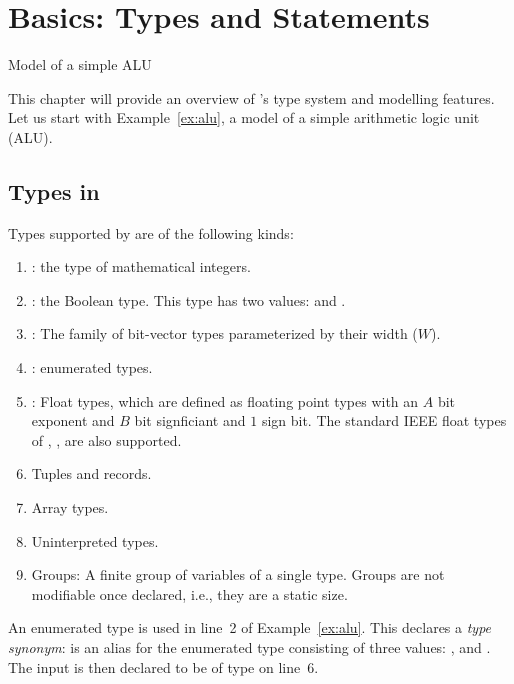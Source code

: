 \chapter{Basics: Types and Statements}
\begin{uclidlisting}[htbp]
    
    \caption{Model of a simple ALU}
\label{ex:alu}
\end{uclidlisting}

This chapter will provide an overview of \uclid{}'s type system and modelling features. Let us start with Example~\ref{ex:alu}, a model of a simple arithmetic logic unit (ALU).

\section{Types in \uclid{}}

Types supported by \uclid{} are of the following kinds:
\begin{enumerate}
    \item {}: the type of mathematical integers.
    \item {}: the Boolean type. This type has two values:  and .
    \item {}: The family of bit-vector types parameterized by their width ($W$).
    \item {}: enumerated types.
    \item {}: Float types, which are defined as floating point types with an $A$ bit exponent and $B$ bit signficiant and $1$ sign bit. The standard IEEE float types of , ,  are also supported.
    \item Tuples and records.
    \item Array types.
    \item Uninterpreted types.
    \item Groups: A finite group of variables of a single type. Groups are not modifiable once declared, i.e., they are a static size. 
\end{enumerate}

An enumerated type is used in line~2 of Example~\ref{ex:alu}. This declares a \textit{type synonym}:  is an alias for the enumerated type consisting of three values: ,  and . The input  is then declared to be of type  on line~6.

